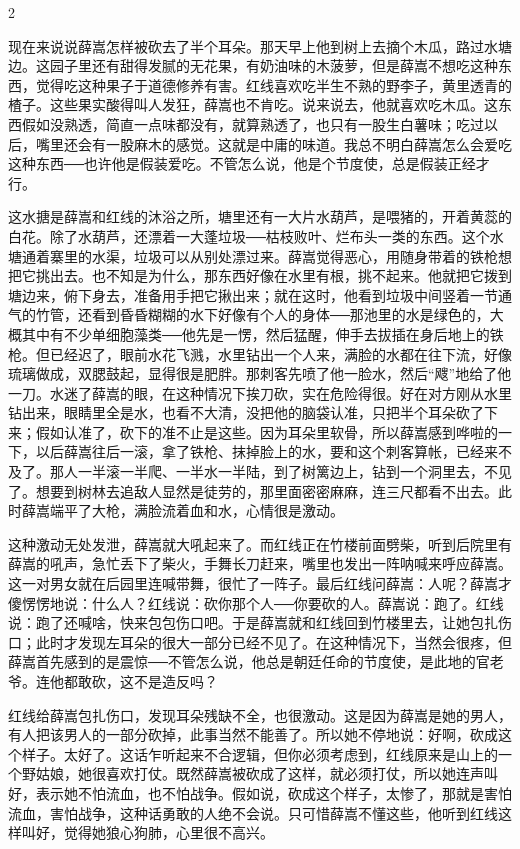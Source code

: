 2 

现在来说说薛嵩怎样被砍去了半个耳朵。那天早上他到树上去摘个木瓜，路过水塘边。这园子里还有甜得发腻的无花果，有奶油味的木菠萝，但是薛嵩不想吃这种东西，觉得吃这种果子于道德修养有害。红线喜欢吃半生不熟的野李子，黄里透青的楂子。这些果实酸得叫人发狂，薛嵩也不肯吃。说来说去，他就喜欢吃木瓜。这东西假如没熟透，简直一点味都没有，就算熟透了，也只有一股生白薯味；吃过以后，嘴里还会有一股麻木的感觉。这就是中庸的味道。我总不明白薛嵩怎么会爱吃这种东西──也许他是假装爱吃。不管怎么说，他是个节度使，总是假装正经才行。 

这水搪是薛嵩和红线的沐浴之所，塘里还有一大片水葫芦，是喂猪的，开着黄蕊的白花。除了水葫芦，还漂着一大蓬垃圾──枯枝败叶、烂布头一类的东西。这个水塘通着寨里的水渠，垃圾可以从别处漂过来。薛嵩觉得恶心，用随身带着的铁枪想把它挑出去。也不知是为什么，那东西好像在水里有根，挑不起来。他就把它拨到塘边来，俯下身去，准备用手把它揪出来；就在这时，他看到垃圾中间竖着一节通气的竹管，还看到昏昏糊糊的水下好像有个人的身体──那池里的水是绿色的，大概其中有不少单细胞藻类──他先是一愣，然后猛醒，伸手去拔插在身后地上的铁枪。但已经迟了，眼前水花飞溅，水里钻出一个人来，满脸的水都在往下流，好像琉璃做成，双腮鼓起，显得很是肥胖。那刺客先喷了他一脸水，然后“飕”地给了他一刀。水迷了薛嵩的眼，在这种情况下挨刀砍，实在危险得很。好在对方刚从水里钻出来，眼睛里全是水，也看不大清，没把他的脑袋认准，只把半个耳朵砍了下来；假如认准了，砍下的准不止是这些。因为耳朵里软骨，所以薛嵩感到哗啦的一下，以后薛嵩往后一滚，拿了铁枪、抹掉脸上的水，要和这个刺客算帐，已经来不及了。那人一半滚一半爬、一半水一半陆，到了树篱边上，钻到一个洞里去，不见了。想要到树林去追敌人显然是徒劳的，那里面密密麻麻，连三尺都看不出去。此时薛嵩端平了大枪，满脸流着血和水，心情很是激动。 

这种激动无处发泄，薛嵩就大吼起来了。而红线正在竹楼前面劈柴，听到后院里有薛嵩的吼声，急忙丢下了柴火，手舞长刀赶来，嘴里也发出一阵呐喊来呼应薛嵩。这一对男女就在后园里连喊带舞，很忙了一阵子。最后红线问薛嵩：人呢？薛嵩才傻愣愣地说：什么人？红线说：砍你那个人──你要砍的人。薛嵩说：跑了。红线说：跑了还喊啥，快来包包伤口吧。于是薛嵩就和红线回到竹楼里去，让她包扎伤口；此时才发现左耳朵的很大一部分已经不见了。在这种情况下，当然会很疼，但薛嵩首先感到的是震惊──不管怎么说，他总是朝廷任命的节度使，是此地的官老爷。连他都敢砍，这不是造反吗？ 

红线给薛嵩包扎伤口，发现耳朵残缺不全，也很激动。这是因为薛嵩是她的男人，有人把该男人的一部分砍掉，此事当然不能善了。所以她不停地说：好啊，砍成这个样子。太好了。这话乍听起来不合逻辑，但你必须考虑到，红线原来是山上的一个野姑娘，她很喜欢打仗。既然薛嵩被砍成了这样，就必须打仗，所以她连声叫好，表示她不怕流血，也不怕战争。假如说，砍成这个样子，太惨了，那就是害怕流血，害怕战争，这种话勇敢的人绝不会说。只可惜薛嵩不懂这些，他听到红线这样叫好，觉得她狼心狗肺，心里很不高兴。 

